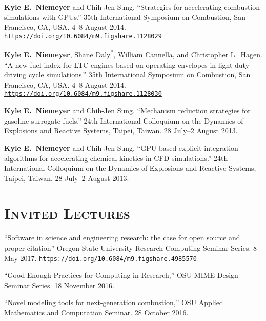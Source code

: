 \documentclass[margin,line,11pt]{res}
\makeatletter
\newlength{\bibhang}
\newlength{\bibsep}
 {\@listi \global\bibsep\itemsep \global\advance\bibsep by\parsep}
\newenvironment{bibenum*}
  {\renewcommand\labelenumi{\theenumi.}%
   \etaremune[
     topsep=0pt,
     itemsep=\bibsep,
     parsep=0pt,partopsep=0pt,
     itemindent=-\bibhang,
     leftmargin={\bibhang+\widthof{[999]}}]}
  {\endetaremune}
\newcommand*{\doi}[1]{\href{https://doi.org/#1}{\nolinkurl{https://doi.org/#1}}}
\makeatother
\begin{document}
\begin{resume}
\begin{bibenum*}
\item \textbf{Kyle E.~Niemeyer} and Chih-Jen Sung.
``Strategies for accelerating combustion simulations with GPUs.''
35th International Symposium on Combustion, San Francisco, CA, USA.
4--8 August 2014.
\doi{10.6084/m9.figshare.1128029}

\item \textbf{Kyle E.~Niemeyer}, Shane Daly\textsuperscript{*}, William Cannella, and Christopher L.\ Hagen.
``A new fuel index for LTC engines based on operating envelopes in light-duty driving cycle simulations.''
35th International Symposium on Combustion, San Francisco, CA, USA.
4--8 August 2014.
\doi{10.6084/m9.figshare.1128030}

\item \textbf{Kyle E.~Niemeyer} and Chih-Jen Sung.
``Mechanism reduction strategies for gasoline surrogate fuels.''
24th International Colloquium on the Dynamics of Explosions and Reactive Systems, Taipei, Taiwan.
28 July--2 August 2013.

\item \textbf{Kyle E.~Niemeyer} and Chih-Jen Sung.
``GPU-based explicit integration algorithms for accelerating chemical kinetics in CFD simulations.''
24th International Colloquium on the Dynamics of Explosions and Reactive Systems, Taipei, Taiwan.
28 July--2 August 2013.

\end{bibenum*}

\section{\textsc{Invited Lectures}}

\begin{bibenum*}
\item ``Software in science and engineering research: the case for open source and proper citation''
Oregon State University Research Computing Seminar Series. 8 May 2017.
\doi{10.6084/m9.figshare.4985570}

\item ``Good-Enough Practices for Computing in Research,''
OSU MIME Design Seminar Series. 18 November 2016.

\item ``Novel modeling tools for next-generation combustion,''
OSU Applied Mathematics and Computation Seminar. 28 October 2016.


\end{bibenum*}
\end{resume}
\end{document}
